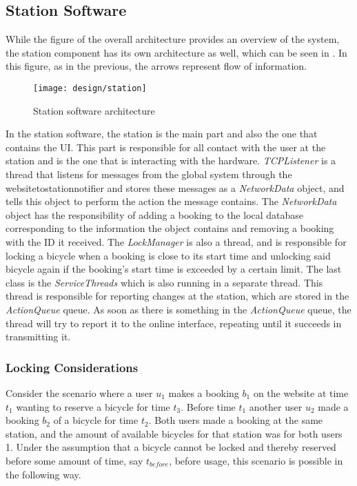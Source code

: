 \subsection{Station Software}
While the figure of the overall architecture provides an overview of the system, the station component has its own architecture as well, which can be seen in . In this figure, as in the previous, the arrows represent flow of information.

\begin{figure}[h]
	\centering
	\texttt{[image: design/station]}
	\caption{Station software architecture}\label{fig:stationarch}
\end{figure}

In the station software, the station is the main part and also the one that contains the UI. 
This part is responsible for all contact with the user at the station and is the one that is interacting with the hardware.
\textit{TCPListener} is a thread that listens for messages from the global system through the websitetostationnotifier and stores these messages as a \textit{NetworkData} object, and tells this object to perform the action the message contains.
The \textit{NetworkData} object has the responsibility of adding a booking to the local database corresponding to the information the object contains and removing a booking with the ID it received.
The \textit{LockManager} is also a thread, and is responsible for locking a bicycle when a booking is close to its start time and unlocking said bicycle again if the booking's start time is exceeded by a certain limit.
The last class is the \textit{ServiceThreads} which is also running in a separate thread.
This thread is responsible for reporting changes at the station, which are stored in the \textit{ActionQueue} queue.
As soon as there is something in the \textit{ActionQueue} queue, the thread will try to report it to the online interface, repeating until it succeeds in transmitting it.

\subsubsection{Locking Considerations}\label{subsec:lockingcons}
Consider the scenario where a user $u_1$ makes a booking $b_1$ on the website at time $t_1$ wanting to reserve a bicycle for time $t_3$. Before time $t_1$ another user $u_2$ made a booking $b_2$ of a bicycle for time $t_2$. Both users made a booking at the same station, and the amount of available bicycles for that station was for both users 1. Under the assumption that a bicycle cannot be locked and thereby reserved before some amount of time, say $t_{before}$, before usage, this scenario is possible in the following way.

